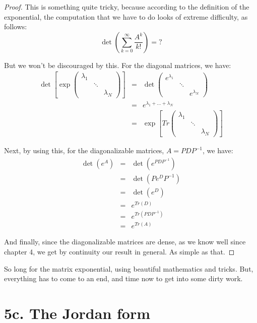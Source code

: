 \documentclass[12pt]{amsbook}
\begin{document}
\begin{proof}
This is something quite tricky, because according to the definition of the exponential, the computation that we have to do looks of extreme difficulty, as follows:
$$\det\left(\sum_{k=0}^\infty\frac{A^k}{k!}\right)=?$$

But we won't be discouraged by this. For the diagonal matrices, we have:
\begin{eqnarray*}
\det\left[\exp\begin{pmatrix}
\lambda_1\\
&\ddots\\
&&\lambda_N
\end{pmatrix}\right]
&=&\det\begin{pmatrix}
e^{\lambda_1}\\
&\ddots\\
&&e^{\lambda_N}
\end{pmatrix}\\
&=&e^{\lambda_1+\ldots+\lambda_N}\\
&=&\exp\left[Tr\begin{pmatrix}
\lambda_1\\
&\ddots\\
&&\lambda_N
\end{pmatrix}\right]
\end{eqnarray*}

Next, by using this, for the diagonalizable matrices, $A=PDP^{-1}$, we have:
\begin{eqnarray*}
\det(e^A)
&=&\det(e^{PDP^{-1}})\\
&=&\det(Pe^DP^{-1})\\
&=&\det(e^D)\\
&=&e^{Tr(D)}\\
&=&e^{Tr(PDP^{-1})}\\
&=&e^{Tr(A)}
\end{eqnarray*}

And finally, since the diagonalizable matrices are dense, as we know well since chapter 4, we get by continuity our result in general. As simple as that.
\end{proof}

So long for the matrix exponential, using beautiful mathematics and tricks. But, everything has to come to an end, and time now to get into some dirty work.

\section*{5c. The Jordan form}
\end{document}
